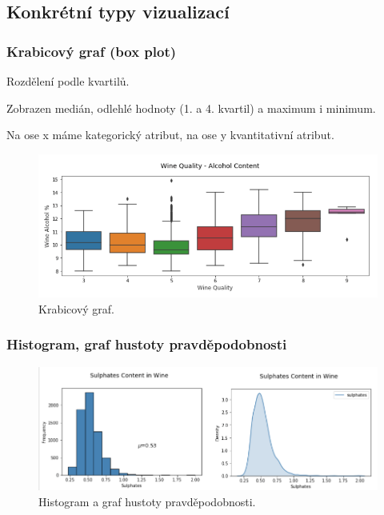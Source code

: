 \subsection{Konkrétní typy vizualizací}

\subsubsection{Krabicový graf (box plot)}

\begin{compactitem}
    \item Rozdělení podle kvartilů.
    \item Zobrazen medián, odlehlé hodnoty (1. a 4. kvartil) a maximum i minimum.
    \item Na ose x máme kategorický atribut, na ose y kvantitativní atribut.
\end{compactitem}

\begin{figure}[H]
    \centering
    \includegraphics[width=1\linewidth]{box_plot.png}
    \caption{Krabicový graf.}
\end{figure}

\subsubsection{Histogram, graf hustoty pravděpodobnosti}

\begin{figure}[H]
    \centering
    \includegraphics[width=1\linewidth]{histogram_density.png}
    \caption{Histogram a graf hustoty pravděpodobnosti.}
\end{figure}

